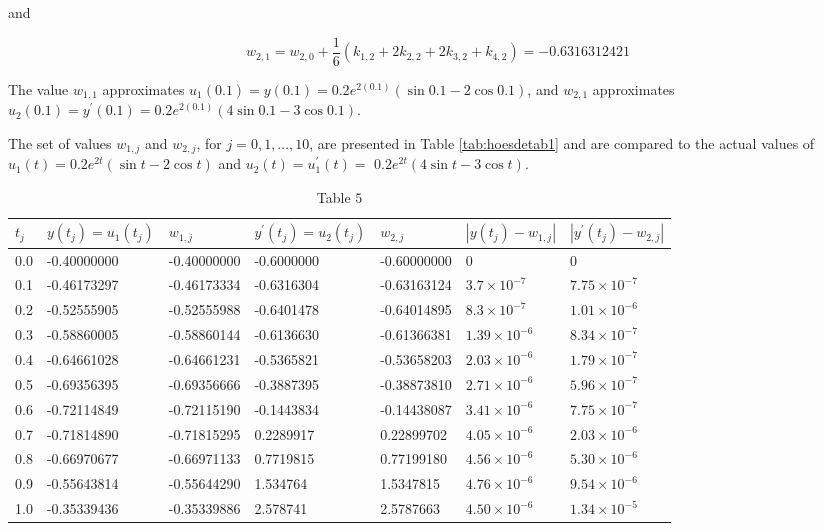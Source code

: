 \begin{mysolution}
and

$$
w_{2,1}=w_{2,0}+\frac{1}{6}\left(k_{1,2}+2 k_{2,2}+2 k_{3,2}+k_{4,2}\right)=-0.6316312421
$$

The value $w_{1,1}$ approximates $u_{1}(0.1)=y(0.1)=0.2 e^{2(0.1)}(\sin 0.1-2 \cos 0.1)$, and $w_{2,1}$ approximates $u_{2}(0.1)=y^{\prime}(0.1)=0.2 e^{2(0.1)}(4 \sin 0.1-3 \cos 0.1)$.

The set of values $w_{1, j}$ and $w_{2, j}$, for $j=0,1, \ldots, 10$, are presented in Table \ref{tab:hoesdetab1} and are compared to the actual values of $u_{1}(t)=0.2 e^{2 t}(\sin t-2 \cos t)$ and $u_{2}(t)=u_{1}^{\prime}(t)=$ $0.2 e^{2 t}(4 \sin t-3 \cos t)$.
\end{mysolution}

\begin{table}[h]
\centering
\begin{tabular}{|l|l|l|l|l|l|l|}
\hline
$t_{j}$ & $y\left(t_{j}\right)=u_{1}\left(t_{j}\right)$ & $w_{1, j}$ & $y^{\prime}\left(t_{j}\right)=u_{2}\left(t_{j}\right)$ & $w_{2, j}$ & $\left|y\left(t_{j}\right)-w_{1, j}\right|$ & $\left|y^{\prime}\left(t_{j}\right)-w_{2, j}\right|$ \\
\hline
0.0 & -0.40000000 & -0.40000000 & -0.6000000 & -0.60000000 & 0 & 0 \\
\hline
0.1 & -0.46173297 & -0.46173334 & -0.6316304 & -0.63163124 & $3.7 \times 10^{-7}$ & $7.75 \times 10^{-7}$ \\
\hline
0.2 & -0.52555905 & -0.52555988 & -0.6401478 & -0.64014895 & $8.3 \times 10^{-7}$ & $1.01 \times 10^{-6}$ \\
\hline
0.3 & -0.58860005 & -0.58860144 & -0.6136630 & -0.61366381 & $1.39 \times 10^{-6}$ & $8.34 \times 10^{-7}$ \\
\hline
0.4 & -0.64661028 & -0.64661231 & -0.5365821 & -0.53658203 & $2.03 \times 10^{-6}$ & $1.79 \times 10^{-7}$ \\
\hline
0.5 & -0.69356395 & -0.69356666 & -0.3887395 & -0.38873810 & $2.71 \times 10^{-6}$ & $5.96 \times 10^{-7}$ \\
\hline
0.6 & -0.72114849 & -0.72115190 & -0.1443834 & -0.14438087 & $3.41 \times 10^{-6}$ & $7.75 \times 10^{-7}$ \\
\hline
0.7 & -0.71814890 & -0.71815295 & 0.2289917 & 0.22899702 & $4.05 \times 10^{-6}$ & $2.03 \times 10^{-6}$ \\
\hline
0.8 & -0.66970677 & -0.66971133 & 0.7719815 & 0.77199180 & $4.56 \times 10^{-6}$ & $5.30 \times 10^{-6}$ \\
\hline
0.9 & -0.55643814 & -0.55644290 & 1.534764 & 1.5347815 & $4.76 \times 10^{-6}$ & $9.54 \times 10^{-6}$ \\
\hline
1.0 & -0.35339436 & -0.35339886 & 2.578741 & 2.5787663 & $4.50 \times 10^{-6}$ & $1.34 \times 10^{-5}$ \\
\hline
\end{tabular}
\caption{\scriptsize Table $5$}
\label{tab:hoesdetab2}
\end{table}

